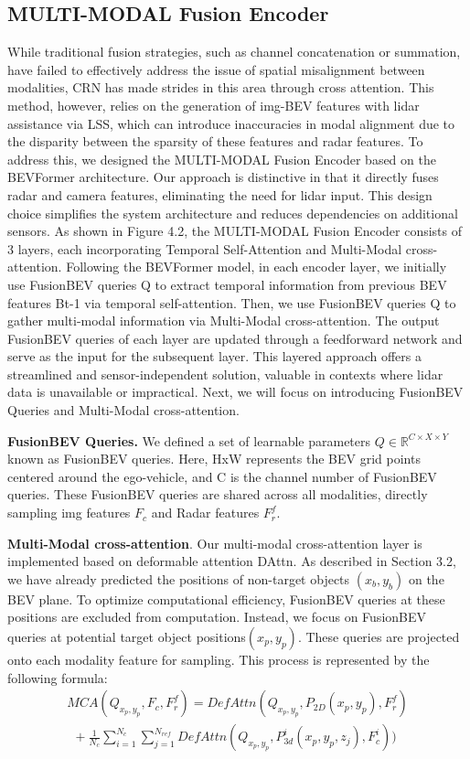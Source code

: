 \documentclass{article}
\begin{document}
\subsection{MULTI-MODAL Fusion Encoder}
While traditional fusion strategies, such as channel concatenation or summation, have failed to effectively address the issue of spatial misalignment between modalities, CRN has made strides in this area through cross attention. This method, however, relies on the generation of img-BEV features with lidar assistance via LSS, which can introduce inaccuracies in modal alignment due to the disparity between the sparsity of these features and radar features. To address this, we designed the MULTI-MODAL Fusion Encoder based on the BEVFormer architecture. Our approach is distinctive in that it directly fuses radar and camera features, eliminating the need for lidar input. This design choice simplifies the system architecture and reduces dependencies on additional sensors. As shown in Figure 4.2, the MULTI-MODAL Fusion Encoder consists of 3 layers, each incorporating Temporal Self-Attention and Multi-Modal cross-attention. Following the BEVFormer model, in each encoder layer, we initially use FusionBEV queries Q to extract temporal information from previous BEV features Bt-1 via temporal self-attention. Then, we use FusionBEV queries Q to gather multi-modal information via Multi-Modal cross-attention. The output FusionBEV queries of each layer are updated through a feedforward network and serve as the input for the subsequent layer. This layered approach offers a streamlined and sensor-independent solution, valuable in contexts where lidar data is unavailable or impractical. Next, we will focus on introducing FusionBEV Queries and Multi-Modal cross-attention.

\noindent \textbf{FusionBEV Queries.} We defined a set of learnable parameters $Q\in \mathbb{R}^{C\times X\times Y} $ known as FusionBEV queries. Here, HxW represents the BEV grid points centered around the ego-vehicle, and C is the channel number of FusionBEV queries. These FusionBEV queries are shared across all modalities, directly sampling img features $F_{c}$ and Radar features $F^{f}_{r}$.

\noindent \textbf{Multi-Modal cross-attention}. Our multi-modal cross-attention layer is implemented based on deformable attention DAttn. As described in Section 3.2, we have already predicted the positions of non-target objects $\left( x_{b},y_{b}\right)  $ on the BEV plane. To optimize computational efficiency, FusionBEV queries at these positions are excluded from computation. Instead, we focus on FusionBEV queries at potential target object positions$\left( x_{p},y_{p}\right)  $. These queries are projected onto each modality feature for sampling. This process is represented by the following formula:
$$\begin{gathered}MCA(Q_{x_{p},y_{p}},F_{c},F^{f}_{r})=DefAttn(Q_{x_{p},y_{p}},P_{2D}(x_{p},y_{p}),F^{f}_{r})\\ \  \   +\frac{1}{N_{c}} \sum^{N_{c}}_{i=1} \sum^{N_{ref}}_{j=1} DefAttn(Q_{x_{p},y_{p}},P^{i}_{3d}(x_{p},y_{p},z_{j}),F^{i}_{c}))\end{gathered} $$
\end{document}
